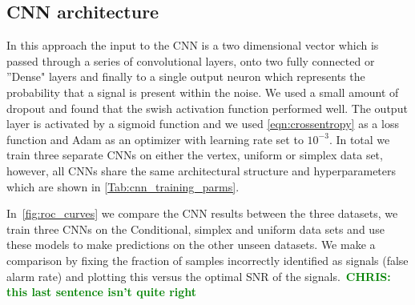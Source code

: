 \documentclass[12pt]{iopart}
\newcommand{\chris}[1]{\textbf{\textcolor{green}{CHRIS: #1}}}
\begin{document}
\subsection{CNN architecture}
In this approach the input to the \ac{CNN} is a two dimensional vector which is passed through a series of convolutional layers, onto two fully connected or ''Dense" layers and finally to a single output neuron which represents the probability that a signal is present within the noise. We used a small amount of dropout and found that the swish activation \cite{ramachandran2017searching} function performed well. The output layer is activated by a sigmoid function and we used \cref{eqn:crossentropy} as a loss function and Adam as an optimizer with learning rate set to $10^{-3}$. In total we train three separate \acp{CNN} on either the vertex, uniform or simplex data set, however, all \acp{CNN} share the same architectural
structure and hyperparameters which are shown in \cref{Tab:cnn_training_parms}.

In~\cref{fig:roc_curves} we compare the \ac{CNN} results between the three
datasets, we train three \acp{CNN} on the Conditional, simplex and uniform data sets
and use these models to make predictions on the other unseen datasets. We make
a comparison by fixing the fraction of samples incorrectly identified as
signals (false alarm rate) and plotting this versus the optimal SNR of the
signals.~\chris{this last sentence isn't quite right} 
\end{document}
